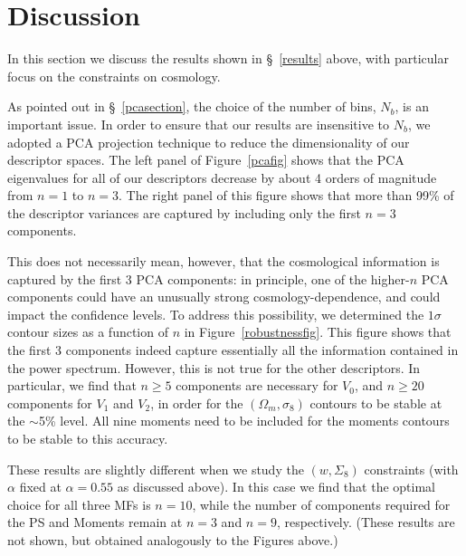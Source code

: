 \documentclass[reprint,aps,prd,superscriptaddress,showkeys,showpacs]{revtex4-1}
\begin{document}


\section{Discussion}
\label{discussion}

In this section we discuss the results shown in \S~\ref{results}
above, with particular focus on the constraints on cosmology.

As pointed out in \S~\ref{pcasection}, the choice of the number of
bins, $N_b$, is an important issue. In order to ensure that our
results are insensitive to $N_b$, we adopted a PCA projection
technique to reduce the dimensionality of our descriptor spaces. The
left panel of Figure~\ref{pcafig} shows that the PCA eigenvalues for
all of our descriptors decrease by about 4 orders of magnitude from
$n=1$ to $n=3$. The right panel of this figure shows that more than
99\% of the descriptor variances are captured by including only the
first $n=3$ components.

This does not necessarily mean, however, that the cosmological
information is captured by the first 3 PCA components: in principle,
one of the higher-$n$ PCA components could have an unusually strong
cosmology-dependence, and could impact the confidence levels.  To
address this possibility, we determined the $1\sigma$ contour sizes as
a function of $n$ in Figure~\ref{robustnessfig}.  This figure shows
that the first 3 components indeed capture essentially all the
information contained in the power spectrum. However, this is not true
for the other descriptors. In particular, we find that $n\geq5$
components are necessary for $V_0$, and $n\geq20$ components for $V_1$
and $V_2$, in order for the $(\Omega_m,\sigma_8)$ contours to be
stable at the $\sim$5\% level. All nine moments need to be included
for the moments contours to be stable to this accuracy.

These results are slightly different when we study the $(w,\Sigma_8)$
constraints (with $\alpha$ fixed at $\alpha=0.55$ as discussed
above). In this case we find that the optimal choice for all three MFs
is $n=10$, while the number of components required for the PS and
Moments remain at $n=3$ and $n=9$, respectively. (These results are
not shown, but obtained analogously to the Figures above.)
\end{document}
